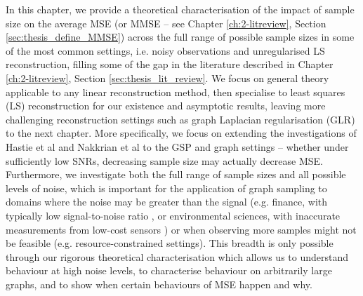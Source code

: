 In this chapter, we provide a theoretical characterisation of the impact of sample size on the average MSE (or MMSE  -- see Chapter \ref{ch:2-litreview}, Section \ref{sec:thesis_define_MMSE}) across the full range of possible sample sizes in some of the most common settings, i.e. noisy observations and unregularised LS  reconstruction, filling some of the gap in the literature described in Chapter \ref{ch:2-litreview}, Section \ref{sec:thesis_lit_review}. We focus on general theory applicable to any linear reconstruction method, then specialise to least squares (LS) reconstruction for our existence and asymptotic results, leaving more challenging reconstruction settings such as graph Laplacian regularisation (GLR) to the next chapter. More specifically, we focus on {\color{blue}extending the investigations of Hastie et al \cite{hastie2022surprises} and Nakkrian et al \cite{nakkiran2019more} to the GSP and graph settings --} whether under sufficiently low SNRs, decreasing sample size may actually decrease MSE. Furthermore, we investigate both the full range of sample sizes and all possible levels of noise, which is important for the application of graph sampling to domains where the noise may be greater than the signal (e.g. finance, with typically low signal-to-noise ratio \cite{nabar2023conservative}, or environmental sciences,  with inaccurate measurements from low-cost sensors \cite{bush2023impact}) or when observing more samples might not be feasible (e.g. resource-constrained settings). This breadth is only possible through our rigorous theoretical characterisation which allows us to understand behaviour at high noise levels, to characterise behaviour on arbitrarily large graphs, and to show when certain behaviours of MSE happen and why. %

